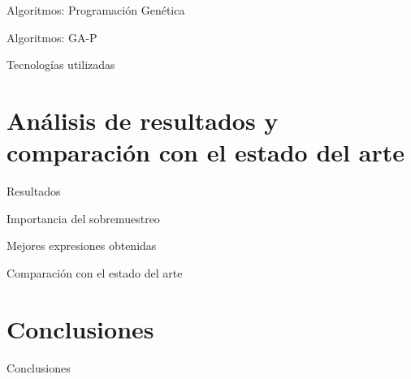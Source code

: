\documentclass{beamer}
\begin{document}
\begin{frame}{Algoritmos: Programación Genética}


\end{frame}

\begin{frame}{Algoritmos: GA-P}


\end{frame}

\begin{frame}{Tecnologías utilizadas}


\end{frame}

\section{Análisis de resultados y comparación con el estado del arte}
\begin{frame}{Resultados}


\end{frame}

\begin{frame}{Importancia del sobremuestreo}


\end{frame}

\begin{frame}{Mejores expresiones obtenidas}


\end{frame}

\begin{frame}{Comparación con el estado del arte}


\end{frame}



\section{Conclusiones}
\begin{frame}{Conclusiones}


\end{frame}
\end{document}
